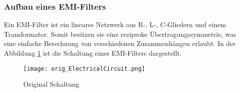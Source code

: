 \subsubsection{Aufbau eines EMI-Filters} \label{subsubsec:emi_filter}
Ein EMI-Filter ist ein lineares Netzwerk aus R-, L-, C-Gliedern und einem Transformator. Somit besitzen sie eine reziproke Übertragungssymmetrie, was eine einfache Berechnung von verschiedenen Zusammenhängen erlaubt. In der Abbildung \ref{fig:orig_Schaltung} ist die Schaltung eines EMI-Filters dargestellt.

\begin{figure}[H]
	\centering
	\texttt{[image: orig\_ElectricalCircuit.png]}
	\caption{Original Schaltung \cite{aufgabenstellung}}
	\label{fig:orig_Schaltung}
\end{figure}

\bigskip